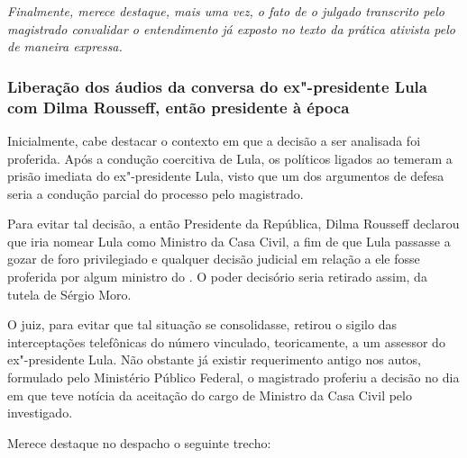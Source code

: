 \emph{Finalmente, merece destaque, mais uma vez, o fato de o julgado
transcrito pelo magistrado convalidar o entendimento já exposto no texto
da prática ativista pelo  de maneira expressa. }

\subsubsection{Liberação dos áudios da conversa do ex"-presidente Lula
com Dilma Rousseff, então presidente à época}

Inicialmente, cabe destacar o contexto em que a decisão a ser analisada
foi proferida. Após a condução coercitiva de Lula, os políticos ligados
ao  temeram a prisão imediata do ex"-presidente Lula, visto que um dos
argumentos de defesa seria a condução parcial do processo pelo
magistrado.

Para evitar tal decisão, a então Presidente da República, Dilma Rousseff
declarou que iria nomear Lula como Ministro da Casa Civil, a fim de que
Lula passasse a gozar de foro privilegiado e qualquer decisão judicial
em relação a ele fosse proferida por algum ministro do . O poder
decisório seria retirado assim, da tutela de Sérgio Moro.

O juiz, para evitar que tal situação se consolidasse, retirou o sigilo
das interceptações telefônicas do número vinculado, teoricamente, a um
assessor do ex"-presidente Lula. Não obstante já existir requerimento
antigo nos autos, formulado pelo Ministério Público Federal, o
magistrado proferiu a decisão no dia em que teve notícia da aceitação do
cargo de Ministro da Casa Civil pelo investigado.

Merece destaque no despacho o seguinte trecho:

